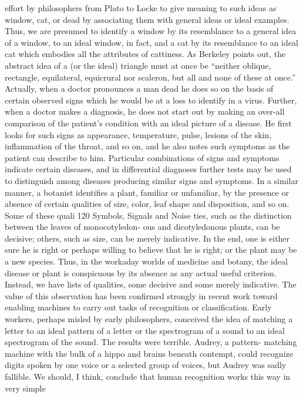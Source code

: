 {{{effort by philosophers from Plato to Locke to give meaning to such
ideas as window, cat, or dead by associating them with general ideas
or ideal examples. Thus, we are presumed to identify a window by
its resemblance to a general idea of a window, to an ideal window,
in fact, and a cat by its resemblance to an ideal cat which embodies
all the attributes of cattiness. As Berkeley points out, the abstract
idea of a (or the ideal) triangle must at once be “neither oblique,
rectangle, equilateral, equicrural nor scaleron, but all and none of
these at once.”
Actually, when a doctor pronounces a man dead he does so on
the basis of certain observed signs which he would be at a loss to
identify in a virus. Further, when a doctor makes a diagnosis, he
does not start out by making an over-all comparison of the patient’s
condition with an ideal picture of a disease. He first looks for such
signs as appearance, temperature, pulse, lesions of the skin, inflammation
of the throat, and so on, and he also notes such symptoms
as the patient can describe to him. Particular combinations of signs
and symptoms indicate certain diseases, and in differential diagnoses
further tests may be used to distinguish among diseases producing
similar signs and symptoms.
In a similar manner, a botanist identifies a plant, familiar or
unfamiliar, by the presence or absence of certain qualities of size,
color, leaf shape and disposition, and so on. Some of these quali
120
Symbols, Signals and Noise
ties, such as the distinction between the leaves of monocotyledon-
ous and dicotyledonous plants, can be decisive; others, such as size,
can be merely indicative. In the end, one is either sure he is right
or perhaps willing to believe that he is right; or the plant may be
a new species.
Thus, in the workaday worlds of medicine and botany, the ideal
disease or plant is conspicuous by its absence as any actual useful
criterion. Instead, we have lists of qualities, some decisive and some
merely indicative.
The value of this observation has been confirmed strongly in
recent work toward enabling machines to carry out tasks of recognition
or classification. Early workers, perhaps misled by early
philosophers, conceived the idea of matching a letter to an ideal
pattern of a letter or the spectrogram of a sound to an ideal spectrogram
of the sound. The results were terrible. Audrey, a pattern-
matching machine with the bulk of a hippo and brains beneath
contempt, could recognize digits spoken by one voice or a selected
group of voices, but Audrey was sadly fallible. We should, I think,
conclude that human recognition works this way in very simple
}}}
